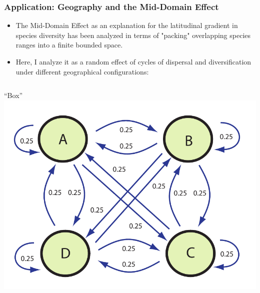 \documentclass[11pt,t]{beamer}
\begin{document}
\begin{frame}
	\frametitle{Application: Geography and the Mid-Domain Effect}
	\begin{itemize}
		\item The Mid-Domain Effect as an explanation for the latitudinal gradient in species diversity has been analyzed in terms of "packing" overlapping species ranges into a finite bounded space.
		\item Here, I analyze it as a random effect of cycles of dispersal and diversification under different geographical configurations:	
	\end{itemize}	
		\begin{columns}		
			\begin{column}[c]{0.4 \textwidth}
				\begin{center}
				``Box'' \\
				\includegraphics[scale=0.25]{box-model.pdf}
				\end{center}
			\end{column}
			

\end{columns}
\end{frame}
\end{document}
